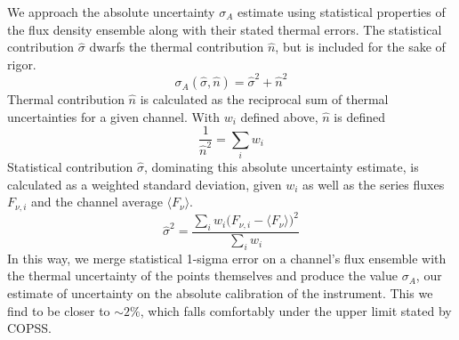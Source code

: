\documentclass{article}
\begin{document}
	We approach the absolute uncertainty $\sigma_{A}$ estimate using statistical properties of the flux density ensemble along with their stated thermal errors.
	The statistical contribution $\hat{\sigma}$ dwarfs the thermal contribution $\hat{n}$, but is included for the sake of rigor.
	$$\sigma_{A}(\hat{\sigma}, \hat{n}) = \hat{\sigma}^{2} + \hat{n}^{2}$$
	Thermal contribution $\hat{n}$ is calculated as the reciprocal sum of thermal uncertainties for a given channel.
	With $w_{i}$ defined above, $\hat{n}$ is defined
	$$ \frac{1}{\hat{n}^{2}} = \sum_{i} w_{i} $$
	Statistical contribution $\hat{\sigma}$, dominating this absolute uncertainty estimate, is calculated as a weighted standard deviation, given $w_{i}$ as well as the series fluxes $F_{\nu,i}$ and the channel average $\langle F_{\nu} \rangle$.
	$$\hat{\sigma}^{2} = \frac{\sum_{i} w_{i} \big( F_{\nu,i} - \langle F_{\nu} \rangle \big)^{2} }{\sum_{i} w_{i}}$$
	In this way, we merge statistical 1-sigma error on a channel's flux ensemble with the thermal uncertainty of the points themselves and produce the value $\sigma_{A}$, our estimate of uncertainty on the absolute calibration of the instrument.
	This we find to be closer to $\sim2\%$, which falls comfortably under the upper limit stated by COPSS.
\end{document}
